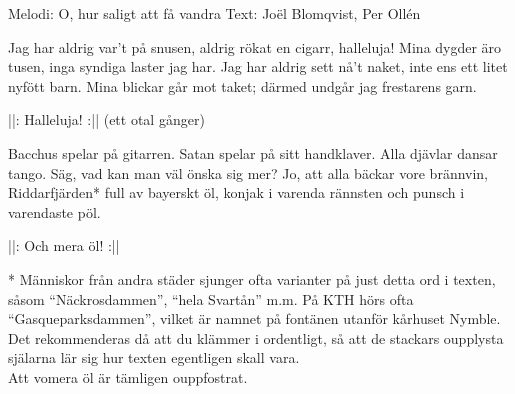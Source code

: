 \begin{song}

\begin{songmeta}
Melodi: O, hur saligt att få vandra
Text: Joël Blomqvist, Per Ollén
\end{songmeta}

\begin{songtext}
Jag har aldrig var't på snusen,
aldrig rökat en cigarr, halleluja!
Mina dygder äro tusen,
inga syndiga laster jag har.
Jag har aldrig sett nå't naket,
inte ens ett litet nyfött barn.
Mina blickar går mot taket;
därmed undgår jag frestarens garn.

||: Halleluja! :|| (ett otal gånger)

Bacchus spelar på gitarren.
Satan spelar på sitt handklaver.
Alla djävlar dansar tango.
Säg, vad kan man väl önska sig mer?
Jo, att alla bäckar vore brännvin,
Riddarfjärden* full av bayerskt öl,
konjak i varenda rännsten
och punsch i varendaste pöl.

||: Och mera öl! :||
\newpage
\end{songtext}

\begin{songnotes}
* Människor från andra städer sjunger ofta varianter på just detta ord i texten,
såsom \textquotedblleft{}Näckrosdammen\textquotedblright{}, \textquotedblleft{}hela Svartån\textquotedblright{} m.m. På KTH hörs ofta \\
\textquotedblleft{}Gasqueparksdammen\textquotedblright{}, vilket är namnet på fontänen utanför kårhuset Nymble.
Det rekommenderas då att du klämmer i ordentligt, så att de stackars oupplysta \\
själarna lär sig hur texten egentligen skall vara.
\\
Att vomera öl är tämligen ouppfostrat.
\end{songnotes}

\end{song}

